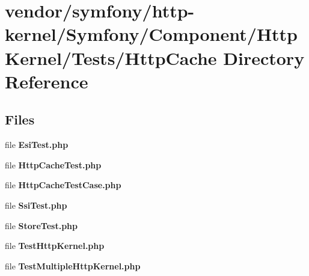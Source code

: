 \section{vendor/symfony/http-\/kernel/\+Symfony/\+Component/\+Http\+Kernel/\+Tests/\+Http\+Cache Directory Reference}
\label{dir_85bdaac278b20f5c11249d79347cf62c}
\subsection*{Files}
\begin{DoxyCompactItemize}
\item 
file {\bf Esi\+Test.\+php}
\item 
file {\bf Http\+Cache\+Test.\+php}
\item 
file {\bf Http\+Cache\+Test\+Case.\+php}
\item 
file {\bf Ssi\+Test.\+php}
\item 
file {\bf Store\+Test.\+php}
\item 
file {\bf Test\+Http\+Kernel.\+php}
\item 
file {\bf Test\+Multiple\+Http\+Kernel.\+php}
\end{DoxyCompactItemize}
